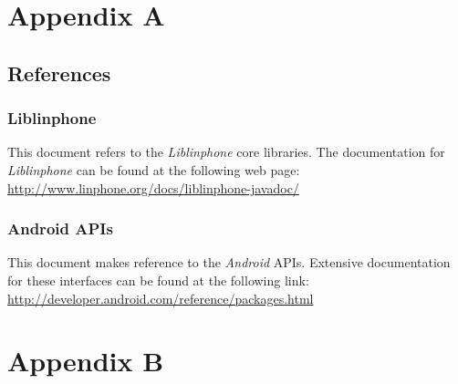 \documentclass[11pt]{article}
\begin{document}
\section{Appendix A}
\subsection{References}
\subsubsection{Liblinphone}
This document refers to the \textit{Liblinphone} core libraries. The documentation for \textit{Liblinphone} can be found at the following web page:\\
\href{http://www.linphone.org/docs/liblinphone-javadoc/}{http://www.linphone.org/docs/liblinphone-javadoc/}
\subsubsection{Android APIs}
This document makes reference to the \textit{Android} APIs. Extensive documentation for these interfaces can be found at the following link:\\
\href{http://developer.android.com/reference/packages.html}{http://developer.android.com/reference/packages.html}

\newpage
\section{Appendix B}
\listoffigures
\end{document}
